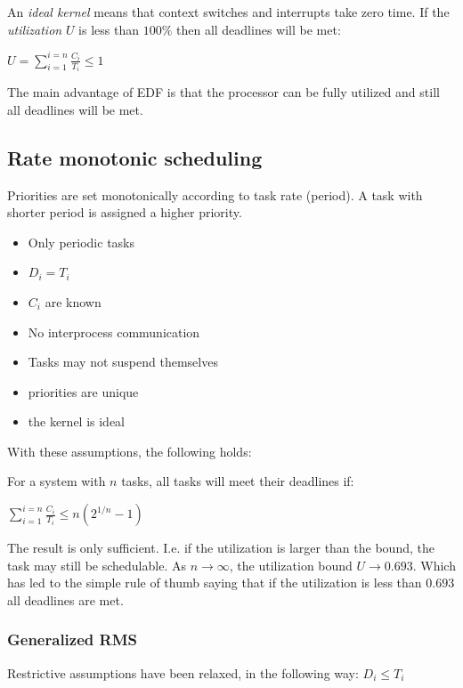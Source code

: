 \documentclass[a4paper]{article}
\begin{document}
An \emph{ideal kernel} means that context switches and interrupts take zero time.
If the \emph{utilization} $U$ is less than $100\%$ then all deadlines will be met:

\begin{center}
$U = \sum_{i=1}^{i=n} \frac{C_i}{T_i} \leq 1$
\end{center}

The main advantage of EDF is that the processor can be fully utilized and still
all deadlines will be met.

\subsection{Rate monotonic scheduling}

Priorities are set monotonically according to task rate (period). A task with
shorter period is assigned a higher priority.

\begin{itemize}
  \item Only periodic tasks
  \item $D_i = T_i$
  \item $C_i$ are known
  \item No interprocess communication
  \item Tasks may not suspend themselves
  \item priorities are unique
  \item the kernel is ideal
\end{itemize}

With these assumptions, the following holds:

For a system with $n$ tasks, all tasks will meet their deadlines if:

\begin{center}
  $ \sum_{i=1}^{i=n} \frac{C_i}{T_i} \leq n(2^{1/n} - 1) $
\end{center}

The result is only sufficient. I.e. if the utilization is larger than the bound,
the task may still be schedulable. As $n \rightarrow \infty$, the utilization
bound $U \rightarrow 0.693$. Which has led to the simple rule of thumb saying
that if the utilization is less than $0.693$ all deadlines are met.

\subsubsection{Generalized RMS}
Restrictive assumptions have been relaxed, in the following way: $D_i \leq T_i$
\end{document}
